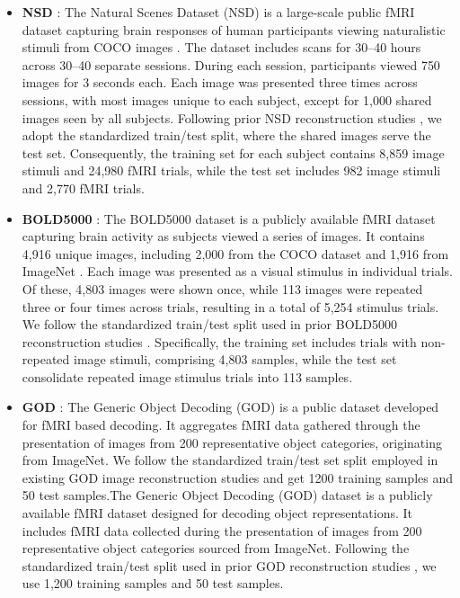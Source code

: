 \begin{itemize}
    \item \textbf{NSD} \citep{allen2022massive}: The Natural Scenes Dataset (NSD) is a large-scale public fMRI dataset capturing brain responses of human participants viewing naturalistic stimuli from COCO images \citep{lin2014microsoft}. The dataset includes scans for 30–40 hours across 30–40 separate sessions. During each session, participants viewed 750 images for 3 seconds each. Each image was presented three times across sessions, with most images unique to each subject, except for 1,000 shared images seen by all subjects. Following prior NSD reconstruction studies \citep{scotti2023reconstructing, takagi2023high}, we adopt the standardized train/test split, where the shared images serve the test set. Consequently, the training set for each subject contains 8,859 image stimuli and 24,980 fMRI trials, while the test set includes 982 image stimuli and 2,770 fMRI trials.
    
    \item \textbf{BOLD5000} \citep{chang2019bold5000}: The BOLD5000 dataset is a publicly available fMRI dataset capturing brain activity as subjects viewed a series of images. It contains 4,916 unique images, including 2,000 from the COCO dataset and 1,916 from ImageNet \citep{deng2009imagenet}. Each image was presented as a visual stimulus in individual trials. Of these, 4,803 images were shown once, while 113 images were repeated three or four times across trials, resulting in a total of 5,254 stimulus trials. We follow the standardized train/test split used in prior BOLD5000 reconstruction studies \citep{chen2023seeing, wang2024decoding}. Specifically, the training set includes trials with non-repeated image stimuli, comprising 4,803 samples, while the test set consolidate repeated image stimulus trials into 113 samples.
    
    \item \textbf{GOD} \citep{horikawa2017generic}: The Generic Object Decoding (GOD) is a public dataset developed for fMRI based decoding. It aggregates fMRI data gathered through the presentation of images from 200 representative object categories, originating from ImageNet. We follow the standardized train/test set split employed in existing GOD image reconstruction studies \citep{sun2023contrast} and get 1200 training samples and 50 test samples.The Generic Object Decoding (GOD) dataset is a publicly available fMRI dataset designed for decoding object representations. It includes fMRI data collected during the presentation of images from 200 representative object categories sourced from ImageNet. Following the standardized train/test split used in prior GOD reconstruction studies \citep{sun2023contrast}, we use 1,200 training samples and 50 test samples.
\end{itemize}









